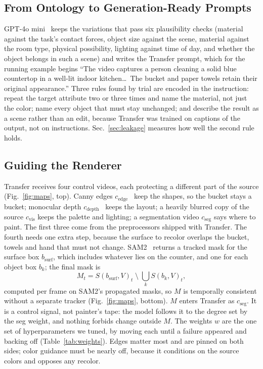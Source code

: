 \subsection{From Ontology to Generation-Ready Prompts}
\label{sec:prompts}
GPT-4o mini~\cite{gpt4omini} keeps the variations that pass six plausibility checks (material against the task's contact forces, object size against the scene, material against the room type, physical possibility, lighting against time of day, and whether the object belongs in such a scene) and writes the Transfer prompt, which for the running example begins ``The video captures a person cleaning a solid blue countertop in a well-lit indoor kitchen\ldots\ The bucket and paper towels retain their original appearance.'' Three rules found by trial are encoded in the instruction: repeat the target attribute two or three times and name the material, not just the color; name every object that must stay unchanged; and describe the result as a scene rather than an edit, because Transfer was trained on captions of the output, not on instructions. Sec.~\ref{sec:leakage} measures how well the second rule holds.

\subsection{Guiding the Renderer}
\label{sec:guidance}
Transfer receives four control videos, each protecting a different part of the source (Fig.~\ref{fig:maps}, top). Canny edges $c_{\mathrm{edge}}$~\cite{canny1986} keep the shapes, so the bucket stays a bucket; monocular depth $c_{\mathrm{depth}}$~\cite{depthanything} keeps the layout; a heavily blurred copy of the source $c_{\mathrm{vis}}$ keeps the palette and lighting; a segmentation video $c_{\mathrm{seg}}$ says where to paint. The first three come from the preprocessors shipped with Transfer. The fourth needs one extra step, because the surface to recolor overlaps the bucket, towels and hand that must not change. SAM2~\cite{sam2} returns a tracked mask for the surface box $b_{\mathrm{surf}}$, which includes whatever lies on the counter, and one for each object box $b_k$; the final mask is
\begin{equation}
    M_t = S(b_{\mathrm{surf}},V)_t \;\setminus\; \bigcup_{k} S(b_k,V)_t ,
    \label{eq:mask}
\end{equation}
computed per frame on SAM2's propagated masks, so $M$ is temporally consistent without a separate tracker (Fig.~\ref{fig:maps}, bottom). $M$ enters Transfer as $c_{\mathrm{seg}}$. It is a control signal, not painter's tape: the model follows it to the degree set by the seg weight, and nothing forbids change outside $M$. The weights $w$ are the one set of hyperparameters we tuned, by moving each until a failure appeared and backing off (Table~\ref{tab:weights}). Edges matter most and are pinned on both sides; color guidance must be nearly off, because it conditions on the source colors and opposes any recolor.

